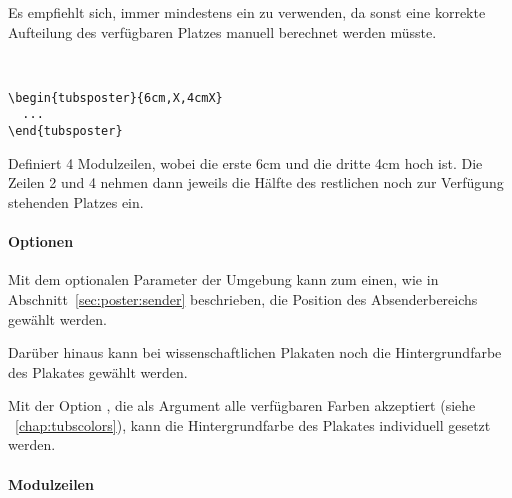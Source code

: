 \begin{hint}
Es empfiehlt sich, immer mindestens ein  zu verwenden, da sonst
eine korrekte Aufteilung des verfügbaren Platzes manuell berechnet werden
müsste.
\end{hint}


\begin{minipage}{0.6\textwidth}
\begin{example}~\par
  \begin{lstlisting}
\begin{tubsposter}{6cm,X,4cmX}
  ...
\end{tubsposter}
  \end{lstlisting}

  \noindent Definiert 4 Modulzeilen, wobei die erste 6cm und die dritte 4cm hoch ist.
  Die Zeilen 2 und 4 nehmen dann jeweils die Hälfte des restlichen 
  noch zur Verfügung stehenden Platzes ein.
\end{example}
\end{minipage}
\hfill
\begin{minipage}{0.3\textwidth}\centering
\end{minipage}

\paragraph{Optionen}

Mit dem optionalen Parameter der Umgebung 
kann zum einen, wie in Abschnitt~\ref{sec:poster:sender} beschrieben,
die Position des Absenderbereichs gewählt werden.

Darüber hinaus kann bei wissenschaftlichen Plakaten noch die
Hintergrundfarbe des Plakates gewählt werden.

\begin{Declaration}
\end{Declaration}

Mit der Option , die als Argument alle verfügbaren
Farben akzeptiert (siehe \chaptername~\ref{chap:tubscolors}), kann die
Hintergrundfarbe des Plakates individuell gesetzt werden.

\paragraph{Modulzeilen}~\par

